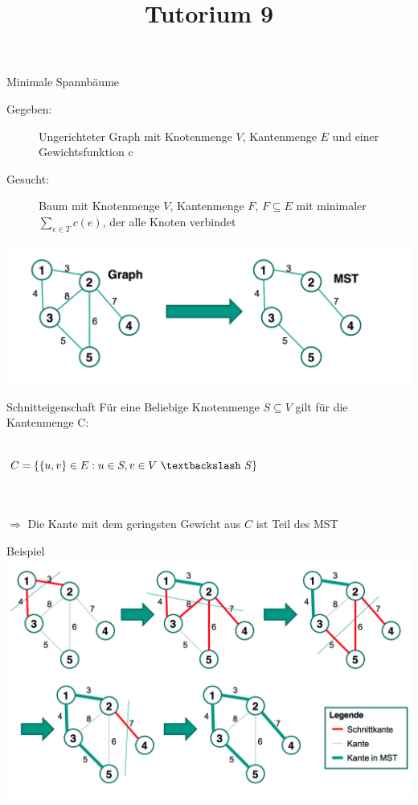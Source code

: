 
\title[Algorithmen I SS 14]{Tutorium 9}

\usepackage{alltt}




\begin{frame}
  \maketitle
\end{frame}

\begin{frame}{Minimale Spannbäume}
	\begin{description}
		\item[Gegeben:] Ungerichteter Graph mit Knotenmenge $V$, Kantenmenge $E$ und einer Gewichtsfunktion c
		\item[Gesucht:] Baum mit Knotenmenge $V$, Kantenmenge $F$, $F \subseteq E$ mit minimaler $\sum_{{
   e \in T }} c(e)$, der alle Knoten verbindet 
	\end{description}

	\includegraphics[scale = 0.25]{images/graphs}
\end{frame}

\begin{frame}{Schnitteigenschaft}
	Für eine Beliebige Knotenmenge $S \subseteq V$ gilt für die Kantenmenge C: \\
	\ \\
	\centerline{$C = \{ \{u,v\} \in E: u \in S, v \in V \  \textbackslash \  S \}$}
	\ \\
	\ \\
	$\Rightarrow$ Die Kante mit dem geringsten Gewicht aus $C$ ist Teil des MST
\end{frame}

\begin{frame}{Beispiel}
	\includegraphics[width=\textwidth]{images/mst}
\end{frame}


